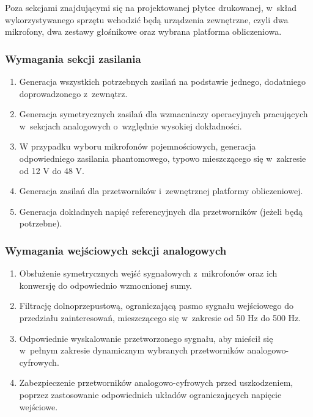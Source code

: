 Poza sekcjami znajdującymi się na projektowanej płytce drukowanej, w~skład
wykorzystywanego sprzętu wchodzić będą urządzenia zewnętrzne, czyli dwa
mikrofony, dwa zestawy głośnikowe oraz wybrana platforma obliczeniowa.

\subsubsection{Wymagania sekcji zasilania}

\begin{enumerate}

    \item Generacja wszystkich potrzebnych zasilań na podstawie jednego,
    dodatniego doprowadzonego z~zewnątrz.

    \item Generacja symetrycznych zasilań dla wzmacniaczy operacyjnych
    pracujących w~sekcjach analogowych o~względnie wysokiej dokładności.

    \item W przypadku wyboru mikrofonów pojemnościowych, generacja odpowiedniego
    zasilania phantomowego, typowo mieszczącego się w~zakresie od 12 V do 48 V.
    
    \item Generacja zasilań dla przetworników i~zewnętrznej platformy
    obliczeniowej.

    \item Generacja dokładnych napięć referencyjnych dla przetworników (jeżeli
    będą potrzebne).

\end{enumerate}

\subsubsection{Wymagania wejściowych sekcji analogowych}

\begin{enumerate}

    \item Obsłużenie symetrycznych wejść sygnałowych z~mikrofonów oraz ich
    konwersję do odpowiednio wzmocnionej sumy.

    \item Filtrację dolnoprzepustową, ograniczającą pasmo sygnału wejściowego do
    przedziału zainteresowań, mieszczącego się w~zakresie od 50 Hz do 500 Hz.

    \item Odpowiednie wyskalowanie przetworzonego sygnału, aby mieścił się
    w~pełnym zakresie dynamicznym wybranych przetworników analogowo-cyfrowych.

    \item Zabezpieczenie przetworników analogowo-cyfrowych przed uszkodzeniem,
    poprzez zastosowanie odpowiednich układów ograniczających napięcie
    wejściowe.

\end{enumerate}

